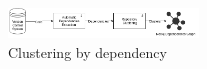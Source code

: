 \begin{figure}
  \centering
    \includegraphics[width=0.45\textwidth]{media/cluster-approach}
    \caption{Clustering by dependency\label{fig:bianca3}}
\end{figure}
